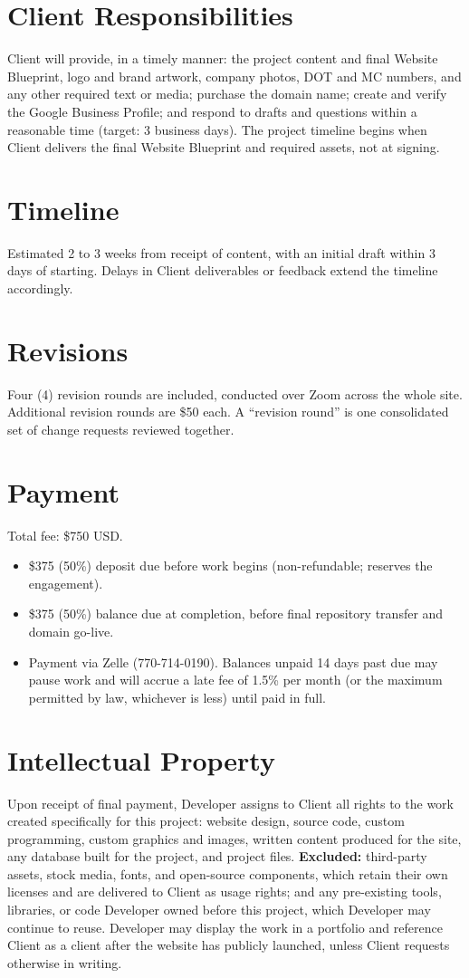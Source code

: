 \documentclass[11pt]{article}
\begin{document}
\begin{Form}
\section{Client Responsibilities}
Client will provide, in a timely manner: the project content and final Website Blueprint, logo and brand artwork, company photos, DOT and MC numbers, and any other required text or media; purchase the domain name; create and verify the Google Business Profile; and respond to drafts and questions within a reasonable time (target: 3 business days). The project timeline begins when Client delivers the final Website Blueprint and required assets, not at signing.

\section{Timeline}
Estimated 2 to 3 weeks from receipt of content, with an initial draft within 3 days of starting. Delays in Client deliverables or feedback extend the timeline accordingly.

\section{Revisions}
Four (4) revision rounds are included, conducted over Zoom across the whole site. Additional revision rounds are \$50 each. A ``revision round'' is one consolidated set of change requests reviewed together.

\section{Payment}
Total fee: \$750 USD.
\begin{itemize}
  \item \$375 (50\%) deposit due before work begins (non-refundable; reserves the engagement).
  \item \$375 (50\%) balance due at completion, before final repository transfer and domain go-live.
  \item Payment via Zelle (770-714-0190). Balances unpaid 14 days past due may pause work and will accrue a late fee of 1.5\% per month (or the maximum permitted by law, whichever is less) until paid in full.
\end{itemize}

\section{Intellectual Property}
Upon receipt of final payment, Developer assigns to Client all rights to the work created specifically for this project: website design, source code, custom programming, custom graphics and images, written content produced for the site, any database built for the project, and project files. \textbf{Excluded:} third-party assets, stock media, fonts, and open-source components, which retain their own licenses and are delivered to Client as usage rights; and any pre-existing tools, libraries, or code Developer owned before this project, which Developer may continue to reuse. Developer may display the work in a portfolio and reference Client as a client after the website has publicly launched, unless Client requests otherwise in writing.


\end{Form}
\end{document}
